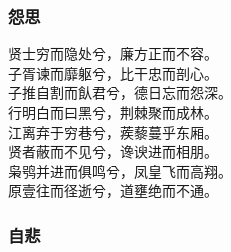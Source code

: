 \documentclass[]{article}
\begin{document}
\hypertarget{header-n240}{%
\subsubsection{怨思}\label{header-n240}}

贤士穷而隐处兮，廉方正而不容。\\
子胥谏而靡躯兮，比干忠而剖心。\\
子推自割而飤君兮，德日忘而怨深。\\
行明白而曰黑兮，荆棘聚而成林。\\
江离弃于穷巷兮，蒺藜蔓乎东厢。\\
贤者蔽而不见兮，谗谀进而相朋。\\
枭鸮并进而俱鸣兮，凤皇飞而高翔。\\
原壹往而径逝兮，道壅绝而不通。

\hypertarget{header-n245}{%
\subsubsection{自悲}\label{header-n245}}
\end{document}
